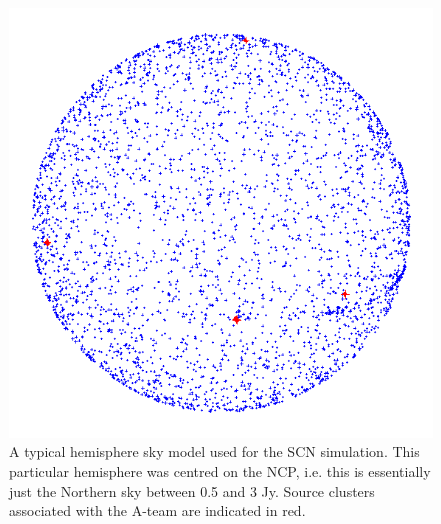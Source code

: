 \documentclass{aa}
\begin{document}
\begin{figure}
\centering \includegraphics[width=.7\columnwidth]{ncp-skymodel-transp}
\caption{\label{fig:ncp-skymodel}A typical hemisphere sky model used for the SCN simulation. This particular hemisphere was centred on the NCP, i.e. this is essentially just the Northern sky between 0.5 and 3 Jy. Source clusters associated with the A-team are indicated in red.}
\end{figure}
\end{document}
